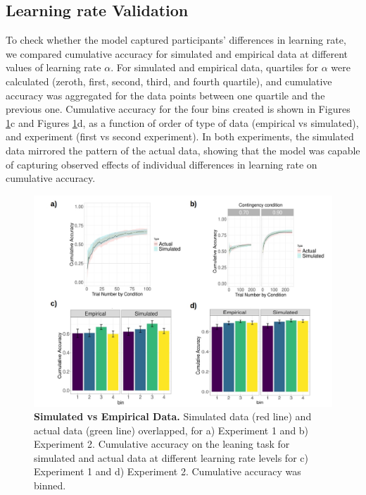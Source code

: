 \documentclass[a4paper,12pt]{article}
\begin{document}
\subsection*{Learning rate  Validation}
To check whether the model captured participants' differences in learning rate, we compared cumulative accuracy for simulated and empirical data at different values of learning rate $\alpha$. For simulated and empirical data, quartiles for $\alpha$ were calculated (zeroth, first, second, third, and fourth quartile), and cumulative accuracy was aggregated for the data points between one quartile and the previous one. Cumulative accuracy for the four bins created is shown in Figures \ref{fig:simvsemp}c and Figures \ref{fig:simvsemp}d, as a function of order of type of data (empirical vs simulated), and experiment (first vs second experiment). In both experiments, the simulated data mirrored the pattern of the actual data, showing that the model was capable of capturing observed effects of individual differences in learning rate on cumulative accuracy. 


\begin{figure}[ht!]
\centerline
{\includegraphics[width=1\textwidth]{figures/binplot_lr.jpg}}
\caption{\textbf{Simulated vs Empirical Data.} Simulated data (red line) and actual data (green line) overlapped, for a) Experiment 1  and b) Experiment 2. Cumulative accuracy on the leaning task for simulated and actual data  at different learning rate levels for c) Experiment 1 and d) Experiment 2.  Cumulative accuracy was binned. }
\label{fig:simvsemp}
\end{figure}
\end{document}
